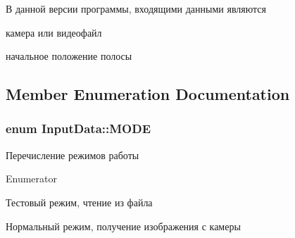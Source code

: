 В данной версии программы, входящими данными являются
\begin{DoxyItemize}
\item камера или видеофайл
\item начальное положение полосы 
\end{DoxyItemize}

\subsection{Member Enumeration Documentation}
\hypertarget{class_input_data_a04d4fa92c99784cb14411f2fb04a4f76}{
\subsubsection[{M\+O\+D\+E}]{\setlength{\rightskip}{0pt plus 5cm}enum {\bf Input\+Data\+::\+M\+O\+D\+E}}}\label{class_input_data_a04d4fa92c99784cb14411f2fb04a4f76}


Перечисление режимов работы 

\begin{Desc}
\item[Enumerator]\par
\begin{description}
\item[{\em 
\hypertarget{class_input_data_a04d4fa92c99784cb14411f2fb04a4f76a8e394a31cfc17f11fb169813baecd248}{T\+E\+S\+T\+\_\+\+M\+O\+D\+E}\label{class_input_data_a04d4fa92c99784cb14411f2fb04a4f76a8e394a31cfc17f11fb169813baecd248}
}]Тестовый режим, чтение из файла \item[{\em 
\hypertarget{class_input_data_a04d4fa92c99784cb14411f2fb04a4f76a5a830b428f1d0edbacb1588d3a7f446f}{N\+O\+R\+M\+A\+L\+\_\+\+M\+O\+D\+E}\label{class_input_data_a04d4fa92c99784cb14411f2fb04a4f76a5a830b428f1d0edbacb1588d3a7f446f}
}]Нормальный режим, получение изображения с камеры \end{description}
\end{Desc}


